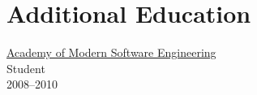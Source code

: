 \section{Additional Education}
\href{http://www.amse.ru/}{Academy of Modern Software Engineering}\\
      Student\\
      2008--2010

\blankline




